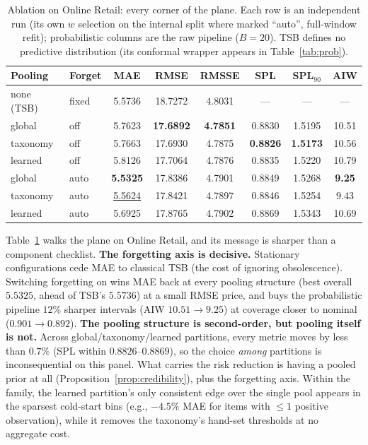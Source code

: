 \documentclass[twocolumn,10pt]{article}
\newcommand{\best}[1]{\textbf{#1}}
\newcommand{\secondbest}[1]{\underline{#1}}
\begin{document}
\begin{table}[t]
\centering
\caption{Ablation on Online Retail: every corner of the plane. Each row
is an independent run (its own $w$ selection on the internal split where
marked ``auto'', full-window refit); probabilistic columns are the raw
pipeline ($B{=}20$). TSB defines no predictive distribution (its
conformal wrapper appears in Table~\ref{tab:prob}).}
\label{tab:ablation}
\small
\setlength{\tabcolsep}{2.9pt}
\begin{tabular}{llcccccc}
\toprule
Pooling & Forget & MAE & RMSE & RMSSE & SPL & SPL$_{90}$ & AIW\\
\midrule
none (TSB) & fixed & 5.5736 & 18.7272 & 4.8031 & --- & --- & ---\\
global & off & 5.7623 & \best{17.6892} & \best{4.7851} & 0.8830 & 1.5195 & 10.51\\
taxonomy & off & 5.7663 & 17.6930 & 4.7875 & \best{0.8826} & \best{1.5173} & 10.56\\
learned & off & 5.8126 & 17.7064 & 4.7876 & 0.8835 & 1.5220 & 10.79\\
global & auto & \best{5.5325} & 17.8386 & 4.7901 & 0.8849 & 1.5268 & \best{9.25}\\
taxonomy & auto & \secondbest{5.5624} & 17.8421 & 4.7897 & 0.8846 & 1.5254 & 9.43\\
learned & auto & 5.6925 & 17.8765 & 4.7902 & 0.8869 & 1.5343 & 10.69\\
\bottomrule
\end{tabular}
\end{table}

Table~\ref{tab:ablation} walks the plane on Online Retail, and its
message is sharper than a component checklist. \textbf{The forgetting
axis is decisive.} Stationary configurations cede MAE to classical
TSB (the cost of ignoring obsolescence). Switching forgetting on wins
MAE back at every pooling structure (best overall $5.5325$, ahead of
TSB's $5.5736$) at a small RMSE price, and buys the probabilistic
pipeline $12\%$ sharper intervals (AIW $10.51\!\to\!9.25$) at coverage
closer to nominal ($0.901\!\to\!0.892$). \textbf{The pooling structure
is second-order, but pooling itself is not.} Across
global/taxonomy/learned partitions, every metric moves by less than
$0.7\%$ (SPL within $0.8826$--$0.8869$), so the choice \emph{among}
partitions is inconsequential on this panel. What carries the risk
reduction is having a pooled prior at all
(Proposition~\ref{prop:credibility}), plus the forgetting axis. Within
the family, the learned partition's only consistent edge over the single
pool appears in the sparsest cold-start bins (e.g., $-4.5\%$ MAE for
items with $\le1$ positive observation), while it removes the
taxonomy's hand-set thresholds at no aggregate cost.
\end{document}

